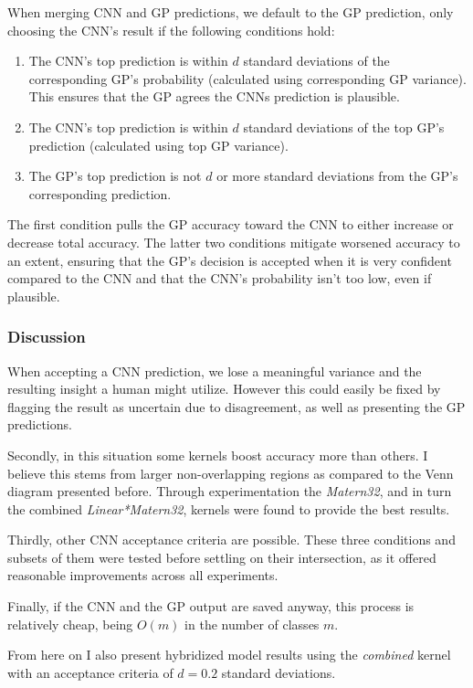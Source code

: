\documentclass{article}
\begin{document}
When merging CNN and GP predictions, we default to the GP prediction, only choosing the CNN's result if the following conditions hold:

\begin{enumerate}
\item The CNN's top prediction is within $d$ standard deviations of the corresponding GP's probability (calculated using corresponding GP variance). This ensures that the GP agrees the CNNs prediction is plausible. 
\item The CNN's top prediction is within $d$ standard deviations of the top GP's prediction (calculated using top GP variance).
\item The GP's top prediction is not $d$ or more standard deviations from the GP's corresponding prediction.
\end{enumerate}

The first condition pulls the GP accuracy toward the CNN to either increase or decrease total accuracy. The latter two conditions mitigate worsened accuracy to an extent, ensuring that the GP's decision is accepted when it is very confident compared to the CNN and that the CNN's probability isn't too low, even if plausible. 

\subsubsection{Discussion}
When accepting a CNN prediction, we lose a meaningful variance and the resulting insight a human might utilize. However this could easily be fixed by flagging the result as uncertain due to disagreement, as well as presenting the GP predictions. 

Secondly, in this situation some kernels boost accuracy more than others. I believe this stems from larger non-overlapping regions as compared to the Venn diagram presented before. Through experimentation the \textit{Matern32}, and in turn the combined \textit{Linear*Matern32}, kernels were found to provide the best results. 

Thirdly, other CNN acceptance criteria are possible. These three conditions and subsets of them were tested before settling on their intersection, as it offered reasonable improvements across all experiments.

Finally, if the CNN and the GP output are saved anyway, this process is relatively cheap, being $O(m)$ in the number of classes $m$.

From here on I also present hybridized model results using the \textit{combined} kernel with an acceptance criteria of $d=0.2$ standard deviations. 
\end{document}
